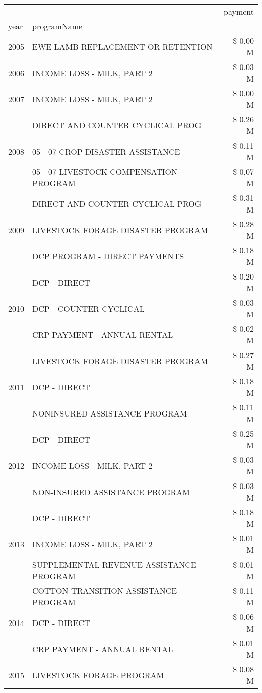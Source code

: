 \begin{tabular}{llr}
\toprule
 &  & payment \\
year & programName &  \\
\midrule
2005 & EWE LAMB REPLACEMENT OR RETENTION & \$ 0.00 M \\
\cline{1-3}
2006 & INCOME LOSS - MILK, PART 2 & \$ 0.03 M \\
\cline{1-3}
2007 & INCOME LOSS - MILK, PART 2 & \$ 0.00 M \\
\cline{1-3}
\multirow[t]{3}{*}{2008} & DIRECT AND COUNTER CYCLICAL PROG & \$ 0.26 M \\
 & 05 - 07 CROP DISASTER ASSISTANCE & \$ 0.11 M \\
 & 05 - 07 LIVESTOCK COMPENSATION PROGRAM & \$ 0.07 M \\
\cline{1-3}
\multirow[t]{3}{*}{2009} & DIRECT AND COUNTER CYCLICAL PROG & \$ 0.31 M \\
 & LIVESTOCK FORAGE DISASTER  PROGRAM & \$ 0.28 M \\
 & DCP PROGRAM - DIRECT PAYMENTS & \$ 0.18 M \\
\cline{1-3}
\multirow[t]{3}{*}{2010} & DCP - DIRECT & \$ 0.20 M \\
 & DCP - COUNTER CYCLICAL & \$ 0.03 M \\
 & CRP PAYMENT - ANNUAL RENTAL & \$ 0.02 M \\
\cline{1-3}
\multirow[t]{3}{*}{2011} & LIVESTOCK FORAGE DISASTER PROGRAM & \$ 0.27 M \\
 & DCP - DIRECT & \$ 0.18 M \\
 & NONINSURED ASSISTANCE PROGRAM & \$ 0.11 M \\
\cline{1-3}
\multirow[t]{3}{*}{2012} & DCP - DIRECT & \$ 0.25 M \\
 & INCOME LOSS - MILK, PART 2 & \$ 0.03 M \\
 & NON-INSURED ASSISTANCE PROGRAM & \$ 0.03 M \\
\cline{1-3}
\multirow[t]{3}{*}{2013} & DCP - DIRECT & \$ 0.18 M \\
 & INCOME LOSS - MILK, PART 2 & \$ 0.01 M \\
 & SUPPLEMENTAL REVENUE ASSISTANCE PROGRAM & \$ 0.01 M \\
\cline{1-3}
\multirow[t]{3}{*}{2014} & COTTON TRANSITION ASSISTANCE PROGRAM & \$ 0.11 M \\
 & DCP - DIRECT & \$ 0.06 M \\
 & CRP PAYMENT - ANNUAL RENTAL & \$ 0.01 M \\
\cline{1-3}
\multirow[t]{3}{*}{2015} & LIVESTOCK FORAGE PROGRAM & \$ 0.08 M \\

\end{tabular}
